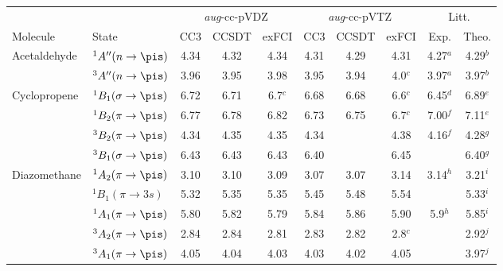 \newcommand{\TDDFT}{TD-DFT}
\newcommand{\CASSCF}{CASSCF}
\newcommand{\CASPT}{CASPT2}
\newcommand{\ADC}[1]{ADC(#1)}
\newcommand{\CC}[1]{CC#1}
\newcommand{\CCSD}{CCSD}
\newcommand{\EOMCCSD}{EOM-CCSD}
\newcommand{\CCSDT}{CCSDT}
\newcommand{\CCSDTQ}{CCSDTQ}
\newcommand{\CCSDTQP}{CCSDTQP}
\newcommand{\CI}{CI}
\newcommand{\sCI}{sCI}
\newcommand{\exCI}{exFCI}
\newcommand{\FCI}{FCI}

\newcommand{\AVDZ}{\emph{aug}-cc-pVDZ}
\newcommand{\AVTZ}{\emph{aug}-cc-pVTZ}
\newcommand{\DAVTZ}{d-\emph{aug}-cc-pVTZ}
\newcommand{\AVQZ}{\emph{aug}-cc-pVQZ}
\newcommand{\DAVQZ}{d-\emph{aug}-cc-pVQZ}
\newcommand{\TAVQZ}{t-\emph{aug}-cc-pVQZ}
\newcommand{\AVPZ}{\emph{aug}-cc-pV5Z}
\newcommand{\DAVPZ}{d-\emph{aug}-cc-pV5Z}
\newcommand{\PopleDZ}{6-31+G(d)}

\begin{tabular}{ll|ccc|ccc|cc}
        &		& \multicolumn{3}{c}{\AVDZ} & \multicolumn{3}{c}{\AVTZ} & \multicolumn{2}{c}{Litt.}\\
  Molecule &State 	& {\CC{3}} & {\CCSDT}  &  {\exCI} & {\CC{3}} & {\CCSDT}  & {\exCI}& Exp. & Theo. \\
    Acetaldehyde	&$^1A'' (n \rightarrow \pis)$			&4.34&4.32&4.34&	4.31&4.29&4.31	& 4.27$^a$ &4.29$^b$	\\
        &$^3A'' (n \rightarrow \pis)$			&3.96&3.95&3.98&	3.95&3.94&4.0$^c$  & 3.97$^a$ &3.97$^b$	\\
    Cyclopropene	&$^1B_1 (\sigma \rightarrow \pis)$		&6.72&6.71&6.7$^c$&6.68&6.68&6.6$^c$& 6.45$^d$ & 6.89$^e$	\\
        &$^1B_2 (\pi \rightarrow \pis)$			&6.77&6.78&6.82&	6.73&6.75&6.7$^c$	& 7.00$^f$  & 7.11$^e$	\\
        &$^3B_2 (\pi \rightarrow \pis)$			&4.34&4.35&4.35&	4.34&	&4.38	& 4.16$^f$  & 4.28$^g$	\\
        &$^3B_1 (\sigma \rightarrow \pis)$		&6.43&6.43&6.43&	6.40&	&6.45	&		  & 6.40$^g$	\\
    Diazomethane	&$^1A_2 (\pi \rightarrow \pis)$ 			&3.10&3.10&3.09&	3.07&3.07&3.14	& 3.14$^h$ &3.21$^i$	\\
        &$^1B_1 (\pi \rightarrow 3s)$ 			&5.32&5.35&5.35&	5.45&5.48&5.54	&		   &5.33$^i$	\\
        &$^1A_1 (\pi \rightarrow \pis)$			&5.80&5.82&5.79&	5.84&5.86&5.90	& 5.9$^h$	   &5.85$^i$	\\
        &$^3A_2 (\pi \rightarrow \pis)$ 			&2.84&2.84&2.81&	2.83&2.82&2.8$^c$	&		   &2.92$^j$	\\
        &$^3A_1 (\pi \rightarrow \pis)$			&4.05&4.04&4.03&	4.03&4.02&4.05	&		   &3.97$^j$	\\

\end{tabular}
